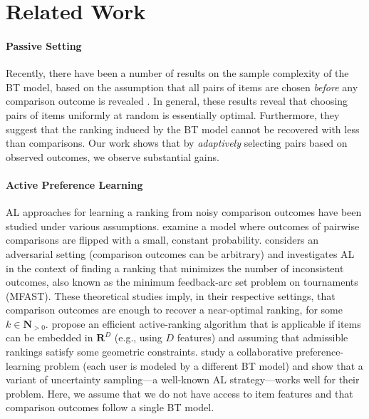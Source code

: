 \section{Related Work}  %
\label{rs:sec:relwork}

\paragraph{Passive Setting}
Recently, there have been a number of results on the sample complexity of the BT model, based on the assumption that all pairs of items are chosen \emph{before} any comparison outcome is revealed
\citep{negahban2012iterative, hajek2014minimax, rajkumar2014statistical, vojnovic2016parameter}.
In general, these results reveal that choosing pairs of items uniformly at random is essentially optimal.
Furthermore, they suggest that the ranking induced by the BT model cannot be recovered with less than  comparisons.
Our work shows that by \emph{adaptively} selecting pairs based on observed outcomes, we observe substantial gains.

\paragraph{Active Preference Learning}
AL approaches for learning a ranking from noisy comparison outcomes have been studied under various assumptions.
\citet{braverman2008noisy} examine a model where outcomes of pairwise comparisons are flipped with a small, constant probability.
\citet{ailon2012active} considers an adversarial setting (comparison outcomes can be arbitrary) and investigates AL in the context of finding a ranking that minimizes the number of inconsistent outcomes, also known as the minimum feedback-arc set problem on tournaments (MFAST).
These theoretical studies imply, in their respective settings, that  comparison outcomes are enough to recover a near-optimal ranking, for some $k \in \mathbf{N}_{>0}$.
\citet{jamieson2011active} propose an efficient active-ranking algorithm that is applicable if items can be embedded in $\mathbf{R}^D$ (e.g., using $D$ features) and assuming that admissible rankings satisfy some geometric constraints.
\citet{wang2014active} study a collaborative preference-learning problem (each user is modeled by a different BT model) and show that a variant of uncertainty sampling---a well-known AL strategy---works well for their problem.
Here, we assume that we do not have access to item features and that comparison outcomes follow a single BT model.

